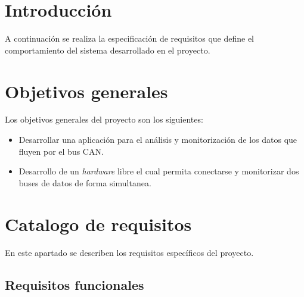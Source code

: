 
\section{Introducción}

A continuación se realiza la especificación de requisitos que define el comportamiento del sistema desarrollado en el proyecto.


\section{Objetivos generales}

Los objetivos generales del proyecto son los siguientes:

\begin{itemize}
\item
Desarrollar una aplicación para el análisis y monitorización de los datos que fluyen por el bus CAN.
\item
Desarrollo de un \emph{hardware} libre el cual permita conectarse y monitorizar dos buses de datos de forma simultanea.
\end{itemize}

\section{Catalogo de requisitos}

En este apartado se describen los requisitos específicos del proyecto.

\subsection{Requisitos funcionales}


